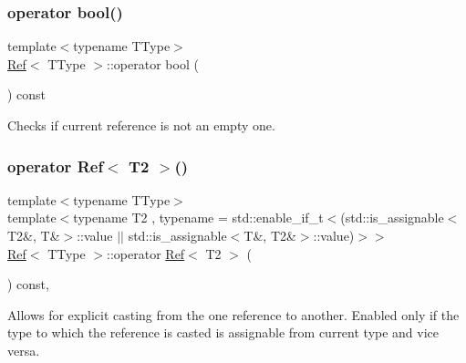 \subsubsection{\texorpdfstring{operator bool()}{operator bool()}}
{\footnotesize\ttfamily template$<$typename T\+Type$>$ \\
\mbox{\hyperlink{class_ref}{Ref}}$<$ T\+Type $>$\+::operator bool (\begin{DoxyParamCaption}{ }\end{DoxyParamCaption}) const\hspace{0.3cm}{\ttfamily [inline]}}



Checks if current reference is not an empty one. 

\mbox{\label{class_ref_a74bedcfebf713236ee66a5c1e06cbfec}} 
\subsubsection{\texorpdfstring{operator Ref$<$ T2 $>$()}{operator Ref< T2 >()}\hspace{0.1cm}{\footnotesize\ttfamily [1/2]}}
{\footnotesize\ttfamily template$<$typename T\+Type$>$ \\
template$<$typename T2 , typename  = std\+::enable\+\_\+if\+\_\+t$<$(std\+::is\+\_\+assignable$<$\+T2\&, T\&$>$\+::value $\vert$$\vert$ std\+::is\+\_\+assignable$<$\+T\&, T2\&$>$\+::value)$>$$>$ \\
\mbox{\hyperlink{class_ref}{Ref}}$<$ T\+Type $>$\+::operator \mbox{\hyperlink{class_ref}{Ref}}$<$ T2 $>$ (\begin{DoxyParamCaption}{ }\end{DoxyParamCaption}) const\hspace{0.3cm}{\ttfamily [inline]}, {\ttfamily [explicit]}}



Allows for explicit casting from the one reference to another. Enabled only if the type to which the reference is casted is assignable from current type and vice versa. 

\mbox{\label{class_ref_a092daaa0d297f615642fc4870cff4f47}} 
